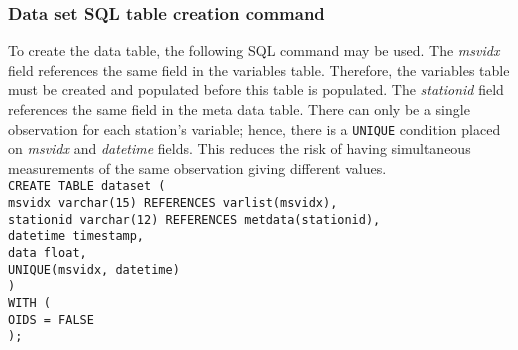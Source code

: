 \subsubsection{Data set SQL table creation command}
\label{sec:dbdtsql}
To create the data table, the following SQL command may be used.  
The \emph{msvidx} field references the same field in the variables table.  
Therefore, the variables table must be created and populated before this table is populated.  
The \emph{stationid} field references the same field in the meta data table.  
There can only be a single observation for each station's variable; hence, there is a \texttt{UNIQUE} condition placed on \emph{msvidx} and \emph{datetime} fields.  
This reduces the risk of having simultaneous measurements of the same observation giving different values.\\

\noindent \texttt{CREATE TABLE data\textunderscore set (\\
\indent msvidx varchar(15) REFERENCES var\textunderscore list(msvidx),\\
\indent stationid varchar(12) REFERENCES met\textunderscore data(stationid),\\
\indent datetime timestamp,\\
\indent data float,\\
\indent UNIQUE(msvidx, datetime)\\
)\\
WITH (\\
\indent OIDS = FALSE\\
);}\\
